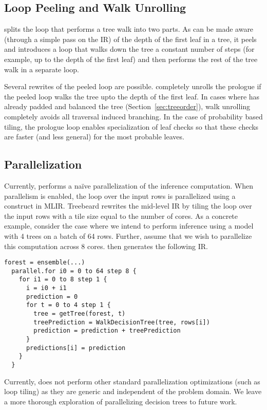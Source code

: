 \subsection{Loop Peeling and Walk Unrolling}
\Treebeard{} splits the loop that performs a tree walk into two parts. As can be made aware (through a simple pass on the IR) of the depth of the first leaf in a tree, it peels and introduces a  loop that walks down the tree a constant number of steps (for example, up to the depth of the first leaf) and then performs the rest of the tree walk in a separate loop.

Several rewrites of the peeled loop are possible. \Treebeard{} completely unrolls the prologue if the peeled loop 
walks the tree upto the depth of the first leaf. In cases where \Treebeard{} has already padded and balanced the 
tree (Section~\ref{sec:treeorder}), walk unrolling completely avoids all traversal induced branching. In the case of 
probability based tiling, the prologue loop enables specialization of leaf checks so that these checks 
are faster (and less general) for the most probable leaves.


\subsection{Parallelization}
Currently, \Treebeard{} performs a na\"ive parallelization of the inference computation. When parallelism is enabled, the 
loop over the input rows is parallelized using a  construct in MLIR. Treebeard rewrites 
the mid-level IR by tiling the loop over the input rows with a tile size equal to the number of cores. 
As a concrete example, consider the case where we intend to perform inference using a model with 4 trees 
on a batch of 64 rows. Further, assume that we wish to parallelize this computation across 8 cores. 
\Treebeard{} then generates the following IR.
\begin{lstlisting}[style=c++]
  forest = ensemble(...)
  parallel.for i0 = 0 to 64 step 8 {
    for i1 = 0 to 8 step 1 {
      i = i0 + i1
      prediction = 0
      for t = 0 to 4 step 1 {
        tree = getTree(forest, t) 
        treePrediction = WalkDecisionTree(tree, rows[i])
        prediction = prediction + treePrediction
      }
      predictions[i] = prediction
    }
  }
\end{lstlisting}
Currently, \Treebeard{} does not perform other standard parallelization optimizations  (such as loop tiling) as they
are generic and independent of the problem domain. We leave a more thorough exploration of parallelizing decision trees
to future work.